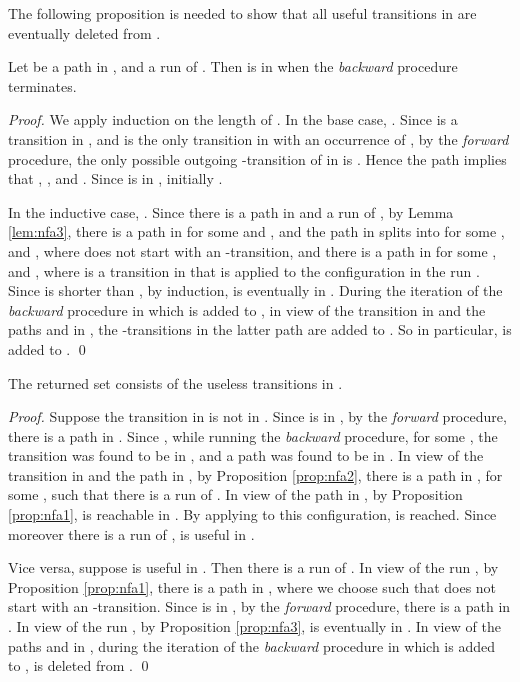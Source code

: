 \documentclass{llncs}
\begin{document}
The following proposition is needed to show that all useful transitions in  are eventually deleted from .

\begin{proposition}
\label{prop:nfa3}
Let  be a path in ,
and  a run of . Then  is in  when the
{\em backward} procedure terminates.
\end{proposition}

\begin{proof}
We apply induction on the length of .
In the base case, . Since  is a transition in , and 
is the only transition in  with an occurrence of , by the {\em forward} procedure, the only possible outgoing -transition of
 in  is . Hence the path 
implies that , ,  and .
Since  is in , initially .

In the inductive case, . Since there is a path  in 
and a run  of , by Lemma \ref{lem:nfa3},
there is a path  in  for some  and , and
the path  in  splits into 
for some ,  and ,
where  does not start with an -transition, and
there is a path  in  for some ,  and ,
where  is a transition in 
that is applied to the configuration  in the run .
Since  is shorter than , by induction,  is eventually in .
During the iteration of the {\em backward} procedure in which  is added to ,
in view of the transition  in  and the paths  and
 in , the -transitions in
the latter path are added to . So in particular,  is added to .
\qed
\end{proof}

\begin{theorem}
\label{thm:nfa2}
The returned set  consists of the useless transitions in .
\end{theorem}

\begin{proof}
Suppose the transition  in  is not in . Since  is in ,
by the {\em forward} procedure, there is a path  in . Since , while running
the {\em backward} procedure, for some , the transition  was found to be in ,
and a path  was found to be in .
In view of the transition  in  and the path  in ,
by Proposition \ref{prop:nfa2}, there is a path  in , for some ,
such that there is a run  of .
In view of the path  in ,
by Proposition \ref{prop:nfa1},  is reachable in .
By applying  to this configuration,  is reached. Since moreover
there is a run  of ,  is useful in .

Vice versa, suppose  is useful in . Then there is a run
 of .
In view of the run ,
by Proposition \ref{prop:nfa1}, there is a path  in ,
where we choose  such that  does not start with an -transition.
Since  is in , by the {\em forward} procedure, there is a path  in .
In view of the run , by Proposition \ref{prop:nfa3},  is eventually in .
In view of the paths  and  in , during the iteration
of the {\em backward} procedure in which  is added to ,  is deleted from .
\qed
\end{proof}
\end{document}
